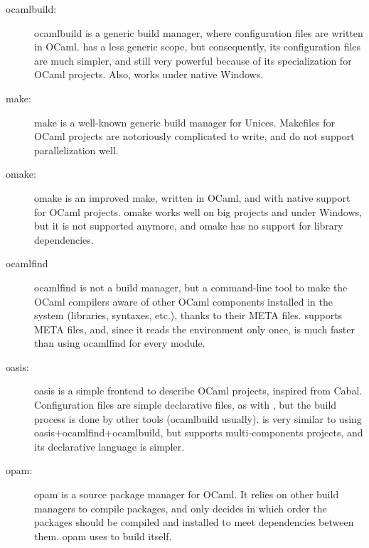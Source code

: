 \begin{description}
\item[ocamlbuild:] ocamlbuild is a generic build manager, where
  configuration files are written in OCaml. \ocpbuild{} has a less
  generic scope, but consequently, its configuration files are much
  simpler, and still very powerful because of its specialization for
  OCaml projects. Also, \ocpbuild{} works under native Windows.
\item[make:] make is a well-known generic build manager for
  Unices. Makefiles for OCaml projects are notoriously complicated to
  write, and do not support parallelization well.
\item[omake:] omake is an improved make, written in OCaml, and with
  native support for OCaml projects. omake works well on big projects
  and under Windows, but it is not supported anymore, and omake has no
  support for library dependencies.
\item[ocamlfind] ocamlfind is not a build manager, but a command-line
  tool to make the OCaml compilers aware of other OCaml components
  installed in the system (libraries, syntaxes, etc.), thanks to their
  META files. \ocpbuild{} supports META files, and, since it reads the
  environment only once, is much faster than using ocamlfind for every
  module.
\item[oasis:] oasis is a simple frontend to describe OCaml projects,
  inspired from Cabal. Configuration files are simple declarative
  files, as with \ocpbuild{}, but the build process is done by other
  tools (ocamlbuild usually). \ocpbuild{} is very similar to using
  oasis+ocamlfind+ocamlbuild, but supports multi-components projects,
  and its declarative language is simpler.
\item[opam:] opam is a source package manager for OCaml. It relies on
  other build managers to compile packages, and only decides in which
  order the packages should be compiled and installed to meet
  dependencies between them. opam uses \ocpbuild{} to build itself.
\end{description}

